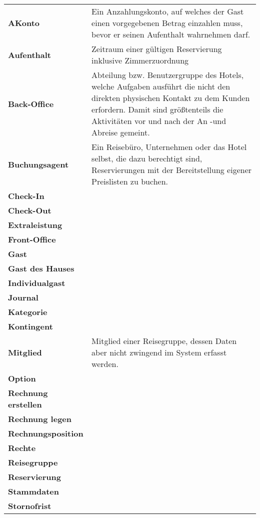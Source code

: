 \documentclass[../Pflichtenheft.tex]{subfiles}
\begin{document}
    \begin{longtable}{p{5cm} p{10cm}}
        \textbf{AKonto} & Ein Anzahlungskonto, auf welches der Gast einen vorgegebenen Betrag einzahlen muss, bevor er seinen Aufenthalt wahrnehmen darf. \\[0.5cm]
        \textbf{Aufenthalt} & Zeitraum einer gültigen Reservierung inklusive Zimmerzuordnung \\[0.5cm]
        \textbf{Back-Office} & Abteilung bzw. Benutzergruppe des Hotels, welche Aufgaben ausführt die nicht den direkten physischen Kontakt zu dem Kunden erfordern. Damit sind größtenteils die Aktivitäten vor und nach der An -und Abreise gemeint.\\[0.5cm]
        \textbf{Buchungsagent} & Ein Reisebüro, Unternehmen oder das Hotel selbst, die dazu berechtigt sind, Reservierungen mit der Bereitstellung eigener Preislisten zu buchen. \\[0.5cm]
        \textbf{Check-In} & \\[0.5cm]
        \textbf{Check-Out} & \\[0.5cm]
        \textbf{Extraleistung} & \\[0.5cm]
        \textbf{Front-Office} &  \\[0.5cm]
        \textbf{Gast} & \\[0.5cm]
        \textbf{Gast des Hauses} & \\[0.5cm]
        \textbf{Individualgast} & \\[0.5cm]
        \textbf{Journal} & \\[0.5cm]
        \textbf{Kategorie} &  \\[0.5cm]
        \textbf{Kontingent} & \\[0.5cm]
        \textbf{Mitglied} & Mitglied einer Reisegruppe, dessen Daten aber nicht zwingend im System erfasst werden. \\[0.5cm]
        \textbf{Option} & \\[0.5cm]
        \textbf{Rechnung erstellen} & \\[0.5cm]
        \textbf{Rechnung legen} & \\[0.5cm]
        \textbf{Rechnungsposition} & \\[0.5cm]
        \textbf{Rechte} & \\[0.5cm]
        \textbf{Reisegruppe} & \\[0.5cm]
        \textbf{Reservierung} & \\[0.5cm]
        \textbf{Stammdaten} & \\[0.5cm]
        \textbf{Stornofrist} & \\[0.5cm]

\end{longtable}
\end{document}
